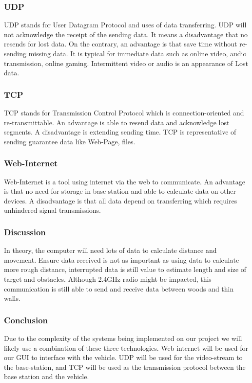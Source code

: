 \documentclass[onecolumn, draftclsnofoot,10pt, compsoc]{IEEEtran}
\begin{document}
\subsubsection{UDP}
UDP stands for User Datagram Protocol\cite{r35} and uses of data transferring. UDP will not acknowledge the receipt of the sending data. It means a disadvantage that no resends for lost data. On the contrary, an advantage is that save time without re-sending missing data. It is typical for immediate data such as online video, audio transmission, online gaming. Intermittent video or audio is an appearance of Lost data.

\subsubsection{TCP}
TCP stands for Transmission Control Protocol which is connection-oriented and re-transmittable. An advantage is able to resend data and acknowledge lost segments. A disadvantage is extending sending time. TCP is representative of sending guarantee data like Web-Page, files.

\subsubsection{Web-Internet}
Web-Internet is a tool using internet via the web to communicate. An advantage is that no need for storage in base station and able to calculate data on other devices. A disadvantage is that all data depend on transferring which requires unhindered signal transmissions.


\subsubsection{Discussion}
In theory, the computer will need lots of data to calculate distance and movement. Ensure data received is not as important as using data to calculate more rough distance, interrupted data is still value to estimate length and size of target and obstacles. Although 2.4GHz radio might be impacted, this communication is still able to send and receive data between woods and thin walls.

\subsubsection{Conclusion}
Due to the complexity of the systems being implemented on our project we will likely use a combination of these three technologies. Web-internet will be used for our GUI to interface with the vehicle. UDP will be used for the video-stream to the base-station, and TCP will be used as the transmission protocol between the base station and the vehicle. 
\end{document}
